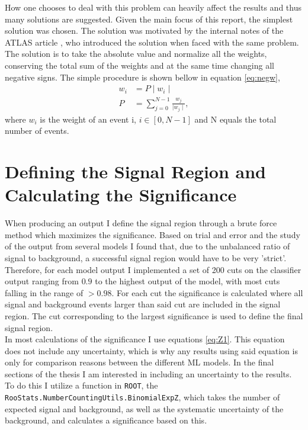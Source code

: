 How one chooses to deal with this problem can heavily affect the results and thus many solutions 
are suggested. Given the main focus of this report, the simplest solution was chosen. The solution was 
motivated by the internal notes of the \ac{ATLAS} article \cite{Aad:2800889}, who introduced the solution 
when faced with the same problem. The solution is to take the absolute value and normalize all the weights, 
conserving the total sum of the weights and at the same time changing all negative signs. The simple procedure 
is shown bellow in equation \ref{eq:negw},
\begin{align}\label{eq:negw}
    w_i & = P \mid w_i \mid\,  \\
    P  & =  \sum_{j=0}^{N-1}\frac{ w_j}{\mid w_j \mid},
\end{align}
where $w_i$ is the weight of an event i, $i \in [0,N-1]$ and N equals the total number of events.
\section{Defining the Signal Region and Calculating the Significance}\label{sec:calcSign}
When producing an output I define the signal region through a brute force method which maximizes the significance. 
Based on trial and error and the study of the output from several models I found that, due to the unbalanced ratio of 
signal to background, a successful signal region would have to be very 'strict'. Therefore, for each model output I implemented a 
set of 200 cuts on the classifier output ranging from $0.9$ to the highest output of the model, with most cuts falling in the range of $>0.98$. For each cut
the significance is calculated where all signal and background events larger than said cut are included in the signal region. The cut 
corresponding to the largest significance is used to define the final signal region.  
\\
In most calculations of the significance I use equations \ref{eq:Z1}. This equation does not include any 
uncertainty, which is why any results using said equation is only for comparison reasons between the different \ac{ML}
models. In the final sections of the thesis I am interested in including an uncertainty to the results. To do this I utilize 
a function in \verb!ROOT!, the \texttt{RooStats.NumberCountingUtils.BinomialExpZ}, which takes the number of expected signal and background, 
as well as the systematic uncertainty of the background, and calculates a significance based on this.